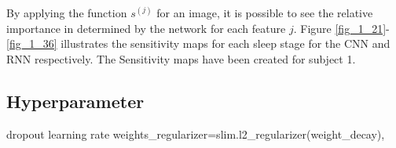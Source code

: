 By applying the function $s^{\left(j\right)}$ for an image, it is possible to see the relative importance in determined by the network for each feature $j$. 
Figure \ref{fig_1_21}-\ref{fig_1_36} illustrates the sensitivity maps for each sleep stage for the CNN and RNN respectively. The Sensitivity maps have been created for subject 1.



\subsection{Hyperparameter}


dropout 
learning rate
weights\_regularizer=slim.l2\_regularizer(weight\_decay),


